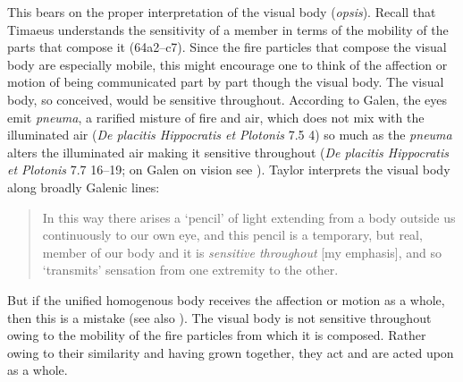 This bears on the proper interpretation of the visual body (\emph{opsis}). Recall that Timaeus understands the sensitivity of a member in terms of the mobility of the parts that compose it (64a2–c7). Since the fire particles that compose the visual body are especially mobile, this might encourage one to think of the affection or motion of being communicated part by part though the visual body. The visual body, so conceived, would be sensitive throughout. According to Galen, the eyes emit \emph{pneuma}, a rarified misture of fire and air, which does not mix with the illuminated air (\emph{De placitis Hippocratis et Plotonis} 7.5 4) so much as the \emph{pneuma} alters the illuminated air making it sensitive throughout (\emph{De placitis Hippocratis et Plotonis} 7.7 16--19; on Galen on vision see \citealt{Ierodiakonou:2014rj}). Taylor interprets the visual body along broadly Galenic lines:
\begin{quote}
	In this way there arises a `pencil' of light extending from a body outside us continuously to our own eye, and this pencil is a temporary, but real, member of our body and it is \emph{sensitive throughout} [my emphasis], and so `transmits' sensation from one extremity to the other. \citep[278]{Taylor:1928qb}
\end{quote}
But if the unified homogenous body receives the affection or motion as a whole, then this is a mistake (see also \citealt[153 n1]{Cornford:1935fk}). The visual body is not sensitive throughout owing to the mobility of the fire particles from which it is composed. Rather owing to their similarity and having grown together, they act and are acted upon as a whole.

